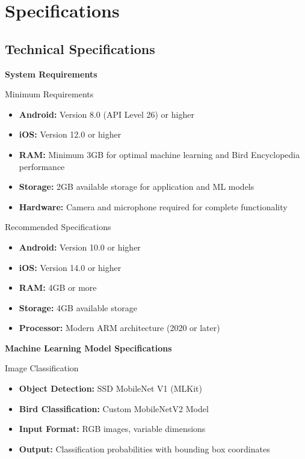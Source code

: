 \chapter{Specifications}

\section{Technical Specifications}

\textbf{System Requirements}

Minimum Requirements
\begin{itemize}
    \item \textbf{Android:} Version 8.0 (API Level 26) or higher
    \item \textbf{iOS:} Version 12.0 or higher
    \item \textbf{RAM:} Minimum 3GB for optimal machine learning and Bird Encyclopedia performance
    \item \textbf{Storage:} 2GB available storage for application and ML models
    \item \textbf{Hardware:} Camera and microphone required for complete functionality
\end{itemize}

Recommended Specifications
\begin{itemize}
    \item \textbf{Android:} Version 10.0 or higher
    \item \textbf{iOS:} Version 14.0 or higher
    \item \textbf{RAM:} 4GB or more
    \item \textbf{Storage:} 4GB available storage
    \item \textbf{Processor:} Modern ARM architecture (2020 or later)
\end{itemize}

\textbf{Machine Learning Model Specifications}

Image Classification
\begin{itemize}
    \item \textbf{Object Detection:} SSD MobileNet V1 (MLKit)
    \item \textbf{Bird Classification:} Custom MobileNetV2 Model
    \item \textbf{Input Format:} RGB images, variable dimensions
    \item \textbf{Output:} Classification probabilities with bounding box coordinates
\end{itemize}

